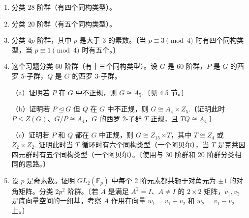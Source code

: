 \begin{enumerate}
（e）由第 1 节的例 3，群 \(P\) 有四个 3 阶子群，它们是
\[
P_1 = \langle t_1 \rangle,\quad P_2 = \langle t_2 \rangle,\quad P_3 = \langle t_1t_2 \rangle,\quad P_4 = \langle t_1t_2^2 \rangle.
\]
对 \(i = 1, 2, 3, 4\)，设 \(G_i = P \rtimes_{\varphi_i} (Z_7 \times Z_7)\)，其中 \(\varphi_i\) 是非平凡同态，其像为 \(P_i\). 对每个 \(i\) 用生成元与关系描述 \(G_i\). 由此推出 \(G_1 \cong G_2\).

（f）证明 \(G_1\) 既不同构于 \(G_3\) 也不同构于 \(G_4\).〔证明 \(G_1\) 的中心阶为 7，而 \(G_3\) 和 \(G_4\) 的中心平凡。〕

（g）证明 \(G_3\) 不同构于 \(G_4\).〔证明 \(G_3\) 中每个 7 阶子群都正规，而 \(G_4\) 有非正规的 7 阶子群。〕

（h）通过证明上面描述的六个不同构的群（来自（a）的两个、来自（c）的一个，以及 \(G_1\)、\(G_3\)、\(G_4\)）就是所有 147 阶群来分类 147 阶群。〔用习题 6 和（d）。〕（\(pq^2\) 阶群（\(p, q\) 是素数，\(p < q\) 且 \(p \mid q-1\)）的分类与此非常相似。）

\item 分类 28 阶群（有四个同构类型）。

\item 分类 20 阶群（有五个同构类型）。

\item 分类 \(4p\) 阶群，其中 \(p\) 是大于 3 的素数。〔当 \(p \equiv 3 \pmod 4\) 时有四个同构类型，当 \(p \equiv 1 \pmod 4\) 时有五个。〕

\item 这个习题分类 60 阶群（有十三个同构类型）。设 \(G\) 是 60 阶群，\(P\) 是 \(G\) 的西罗 5-子群，\(Q\) 是 \(G\) 的西罗 3-子群。

（a）证明若 \(P\) 在 \(G\) 中不正规，则 \(G \cong A_5\).〔见 4.5 节。〕

（b）证明若 \(P \trianglelefteq G\) 但 \(Q\) 在 \(G\) 中不正规，则 \(G \cong A_4 \times Z_5\).〔证明此时 \(P \leq Z(G)\)、\(G/P \cong A_4\)，\(G\) 的西罗 2-子群 \(T\) 正规，且 \(TQ \cong A_4\).〕

（c）证明若 \(P\) 和 \(Q\) 都在 \(G\) 中正规，则 \(G \cong Z_{15} \rtimes T\)，其中 \(T \cong Z_4\) 或 \(Z_2 \times Z_2\). 证明此时当 \(T\) 循环时有六个同构类型（一个阿贝尔），当 \(T\) 是克莱因四元群时有五个同构类型（一个阿贝尔）。〔使用与 30 阶群和 20 阶群分类相同的思路。〕

\item 设 \(p\) 是奇素数。证明 \(GL_2(\mathbb{F}_p)\) 中每个 2 阶元素都共轭于对角元为 \(\pm 1\) 的对角矩阵。分类 \(2p^2\) 阶群。〔若 \(A\) 是满足 \(A^2 = I\)、\(A \neq I\) 的 \(2 \times 2\) 矩阵，\(v_1, v_2\) 是底向量空间的一组基，考察 \(A\) 作用在向量 \(w_1 = v_1 + v_2\) 和 \(w_2 = v_1 - v_2\) 上。〕


\end{enumerate}

